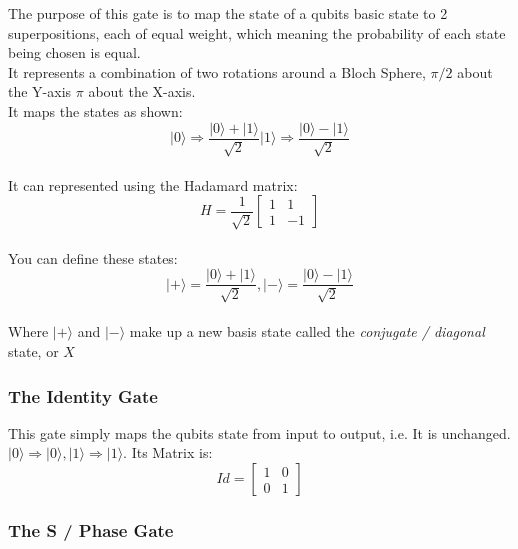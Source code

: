 \documentclass{report}
\begin{document}
The purpose of this gate is to map the state of a qubits basic state to
2 superpositions, each of equal weight, which meaning the probability of
each state being chosen is equal.\\
It represents a combination of two rotations around a Bloch Sphere,
\(\pi /2\) about the Y-axis \(\pi\) about the X-axis.\\
It maps the states as shown:\\
\[
\lvert0\rangle \Rightarrow \frac{\lvert0\rangle + \lvert1\rangle}{ \sqrt{2}}                 \lvert1\rangle \Rightarrow \frac{\lvert0\rangle - \lvert1\rangle}{ \sqrt{2}}\]\\
It can represented using the Hadamard matrix:\\
\[
H = \frac{1}{\sqrt{2}} \left[ \begin{matrix} 1 & 1\\1 & -1\end{matrix} \right]\]\\
You can define these states:\\
\[
\lvert+\rangle = \frac{\lvert0\rangle +\lvert1\rangle}{\sqrt{2}}, \lvert-\rangle = \frac{\lvert0\rangle -\lvert1\rangle}{\sqrt{2}}\]\\
Where \(\lvert+\rangle\) and \(\lvert-\rangle\) make up a new basis state called
the \emph{conjugate / diagonal} state, or \(X\)

\subsubsection{The Identity Gate}

This gate simply maps the qubits state from input to output, i.e. It is
unchanged. $|0\rangle \Rightarrow |0\rangle, |1\rangle \Rightarrow |1\rangle$. Its Matrix is:\\
\[
Id = \left[ \begin{matrix} 1 & 0\\0 & 1\end{matrix} \right]\]

\subsubsection{The S / Phase Gate}
\end{document}
